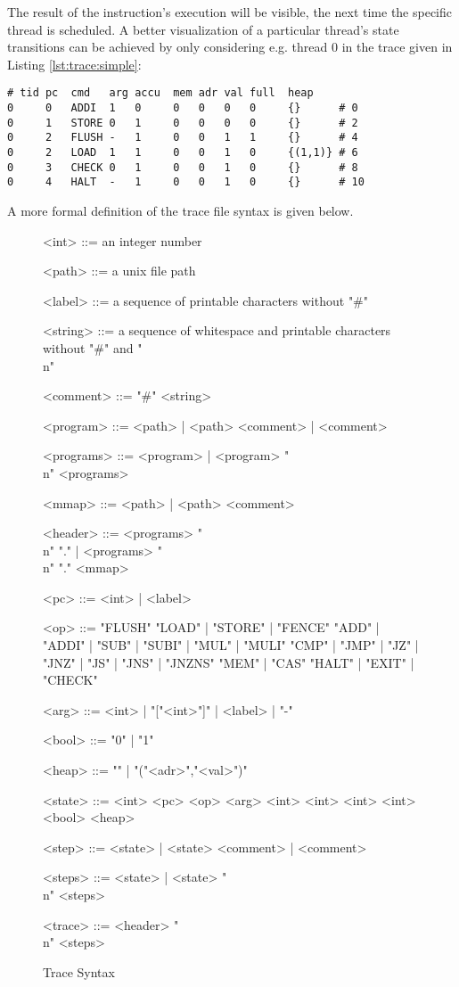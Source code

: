 The result of the instruction's execution will be visible, the next time the specific thread is scheduled.
A better visualization of a particular thread's state transitions can be achieved by only considering e.g. thread 0 in the trace given in Listing \ref{lst:trace:simple}:

\begin{lstlisting}[language={[concubine]Assembler}, xleftmargin=\parindent]
# tid pc  cmd   arg accu  mem adr val full  heap
0     0   ADDI  1   0     0   0   0   0     {}      # 0
0     1   STORE 0   1     0   0   0   0     {}      # 2
0     2   FLUSH -   1     0   0   1   1     {}      # 4
0     2   LOAD  1   1     0   0   1   0     {(1,1)} # 6
0     3   CHECK 0   1     0   0   1   0     {}      # 8
0     4   HALT  -   1     0   0   1   0     {}      # 10
\end{lstlisting}

A more formal definition of the trace file syntax is given below.

\begin{figure}[h]
\begin{grammar}
\small

<int> ::= an integer number

<path> ::= a unix file path

<label> ::= a sequence of printable characters without "#"

<string> ::= a sequence of whitespace and printable characters without "#" and "\\n"

<comment> ::= "#" <string>

<program> ::= <path> | <path> <comment> | <comment>

<programs> ::= <program> | <program> "\\n" <programs>

<mmap> ::= <path> | <path> <comment>

<header> ::= <programs> "\\n" "." | <programs> "\\n" "." <mmap>

<pc> ::= <int> | <label>

<op> ::= "FLUSH"
\alt "LOAD" | "STORE" | "FENCE"
\alt "ADD" | "ADDI" | "SUB" | "SUBI" | "MUL" | "MULI"
\alt "CMP" | "JMP" | "JZ" | "JNZ" | "JS" | "JNS" | "JNZNS"
\alt "MEM" | "CAS"
\alt "HALT" | "EXIT" | "CHECK"

<arg> ::= <int> | "["<int>"]" | <label> | "-"

<bool> ::= "0" | "1"

<heap> ::= "{}" | "{("<adr>","<val>")}"

<state> ::= <int> <pc> <op> <arg> <int> <int> <int> <int> <bool> <heap>

<step> ::= <state> | <state> <comment> | <comment>

<steps> ::= <state> | <state> "\\n" <steps>

<trace> ::= <header> "\\n" <steps>
\end{grammar}
\caption{Trace Syntax}
\label{fig:syntax:trace}
\end{figure}

